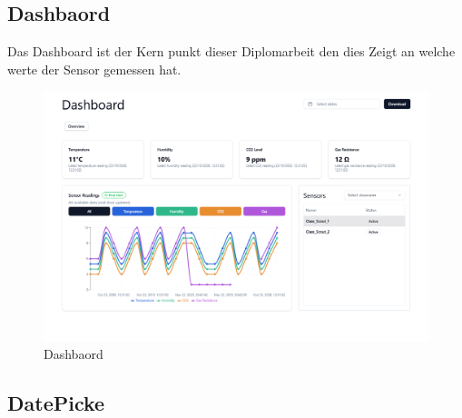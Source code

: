 \begin{inhalt}
\begin{enumerate}[label=\textbf{\arabic*.}]
\clearpage

\section{Dashbaord}

Das Dashboard ist der Kern punkt dieser Diplomarbeit den dies Zeigt an welche werte der Sensor gemessen hat.

\begin{figure}[!htb]
\centering
\includegraphics[width=1\textwidth]{files/Thomas/pics/Website/dashbord/dashbaord-screen.png}
\caption[Bildbezeichnung für Abbildungsverzeichnis]{Dashbaord}
\label{fig:gehaeuse_internet_bild}
\end{figure}

\subsection{DatePicke}


\end{enumerate}
\end{inhalt}
